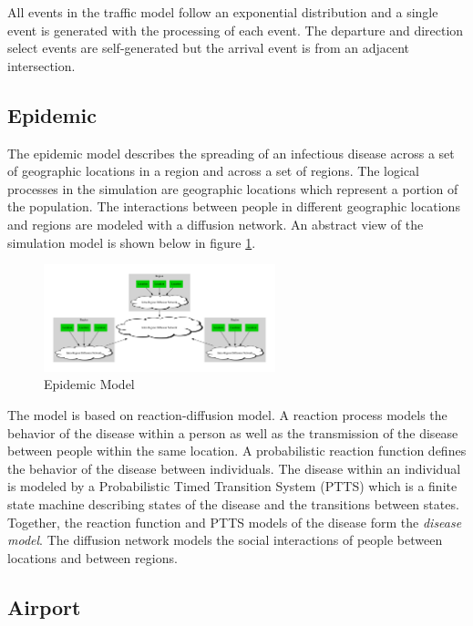 \documentclass[11pt]{book}
\begin{document}
All events in the traffic model follow an exponential distribution and a single event
is generated with the processing of each event.  The departure and direction select events
are self-generated but the arrival event is from an adjacent intersection.

\subsection{Epidemic}

The epidemic model describes the spreading of an infectious disease across a set of
geographic locations in a region and across a set of regions.  The logical processes in
the simulation are geographic locations which represent a portion of the population.  The
interactions between people in different geographic locations and regions are modeled with
a diffusion network.  An abstract view of the simulation model is shown below in figure
\ref{epidemic_model}.

\begin{figure}
    \centering
    \includegraphics[width=0.6\textwidth,quiet]{figs/graphviz/epidemic.pdf}
    \caption{Epidemic Model}\label{epidemic_model}
\end{figure}

The model is based on reaction-diffusion model\cite{perumalla-12}.  A reaction process
models the behavior of the disease within a person as well as the transmission of the
disease between people within the same location.  A probabilistic reaction function defines
the behavior of the disease between individuals\cite{barrett-08}.  The disease within an
individual is modeled by a Probabilistic Timed Transition System (PTTS)\cite{barrett-08}
which is a finite state machine describing states of the disease and the transitions between states.
Together, the reaction function and PTTS models of the disease form the \emph{disease model}.
The diffusion network models the social interactions of people between locations and between
regions\cite{barrett-08}.

\subsection{Airport}
\end{document}
